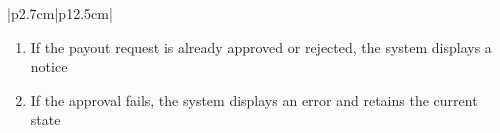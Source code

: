 \begin{table}[H]
\begin{tabular}{|p{2.7cm}|p{12.5cm}|}
\begin{minipage}[t]{\linewidth}
\begin{enumerate}[topsep=0pt,itemsep=1pt,parsep=0pt,partopsep=0pt]
                                          \item If the payout request is already approved or rejected, the system displays a
                                                notice
                                          \item If the approval fails, the system displays an error and retains the current
                                                state
                                      \end{enumerate}
                                  \end{minipage} \\
        \hline
    \end{tabular}
    \label{tab:admin-approve-payout-request}
\end{table}

